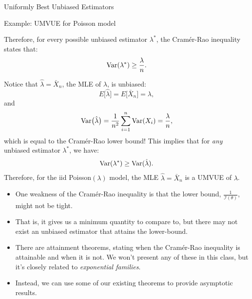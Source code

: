 \begin{frame}[allowframebreaks]{Uniformly Best Unbiased Estimators}
\begin{exampleblock}{Example: UMVUE for Poisson model}
{      Therefore, for every possible unbiased estimator $\lambda^*$, the Cram\'er-Rao inequality states that:
      $$
      \mathrm{Var}(\lambda^*) \geq \frac{\lambda}{n}.
      $$

      Notice that $\hat{\lambda} = \bar{X}_n$, the MLE of $\lambda$, is unbiased:
      $$
      E\big[\hat{\lambda}\big] = E\big[\bar{X}_n\big] = \lambda,
      $$
      and
      $$
      \mathrm{Var}\big(\hat{\lambda}\big) = \frac{1}{n^2} \sum_{i = 1}^{n} \mathrm{Var}(X_i) = \frac{\lambda}{n},
      $$
      which is equal to the Cram\'er-Rao lower bound! This implies that for \emph{any} unbiased estimator $\lambda^*$, we have:
      $$
      \mathrm{Var}(\lambda^*) \geq \mathrm{Var}(\hat{\lambda}).
      $$
      Therefore, for the iid Poisson$(\lambda)$ model, the MLE $\hat{\lambda} = \bar{X}_n$ is a UMVUE of $\lambda$.
    }

  \end{exampleblock}

  \framebreak

  \begin{itemize}
    \item One weakness of the Cram\'er-Rao inequality is that the lower bound, $\frac{1}{\mathcal{I}(\theta)}$, \alert{might not be tight}.
    \item That is, it gives us a minimum quantity to compare to, but there may not exist an unbiased estimator that \alert{attains} the lower-bound.
    \item There are attainment theorems, stating when the Cram\'er-Rao inequality is attainable and when it is not. We won't present any of these in this class, but it's closely related to \emph{exponential families}.
    \item Instead, we can use some of our existing theorems to provide asymptotic results.
  \end{itemize}

  \end{frame}

